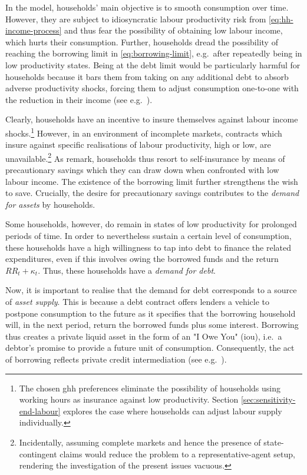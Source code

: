 \documentclass[a4paper,12pt]{article} %
\numberwithin{equation}{section} %
\numberwithin{figure}{section}
\numberwithin{table}{section}
\begin{document}
In the model, households' main objective is to smooth consumption over time. However, they are subject to idiosyncratic labour productivity risk from \eqref{eq:hh-income-process} and thus fear the possibility of obtaining low labour income, which hurts their consumption. Further, households dread the possibility of reaching the borrowing limit in \eqref{eq:borrowing-limit}, e.g.~after repeatedly being in low productivity states. Being at the debt limit would be particularly harmful for households because it bars them from taking on any additional debt to absorb adverse productivity shocks, forcing them to adjust consumption one-to-one with the reduction in their income (see e.g.~\cite{carroll2021}). 

Clearly, households have an incentive to insure themselves against labour income shocks.\footnote{The chosen \Gls{ghh} preferences eliminate the possibility of households using working hours as insurance against low productivity. Section \ref{sec:sensitivity-end-labour} explores the case where households can adjust labour supply individually.} However, in an environment of incomplete markets, contracts which insure against specific realisations of labour productivity, high or low, are unavailable.\footnote{Incidentally, assuming complete markets and hence the presence of state-contingent claims would reduce the problem to a representative-agent setup, rendering the investigation of the present issues vacuous.} As \textcite{heath2009} remark, households thus resort to self-insurance by means of precautionary savings which they can draw down when confronted with low labour income. The existence of the borrowing limit further strengthens the wish to save. Crucially, the desire for precautionary savings contributes to the \textit{demand for assets} by households. 

Some households, however, do remain in states of low productivity for prolonged periods of time. In order to nevertheless sustain a certain level of consumption, these households have a high willingness to tap into debt to finance the related expenditures, even if this involves owing the borrowed funds and the return $RR_t + \kappa_t$. Thus, these households have a \textit{demand for debt}.

Now, it is important to realise that the demand for debt corresponds to a source of \textit{asset supply}. This is because a debt contract offers lenders a vehicle to postpone consumption to the future as it specifies that the borrowing household will, in the next period, return the borrowed funds plus some interest. Borrowing thus creates a private liquid asset in the form of an "I Owe You" (\Gls{iou}), i.e.~a debtor's promise to provide a future unit of consumption. Consequently, the act of borrowing reflects private credit intermediation (see e.g.~\cite{bayer2023}).
\end{document}
